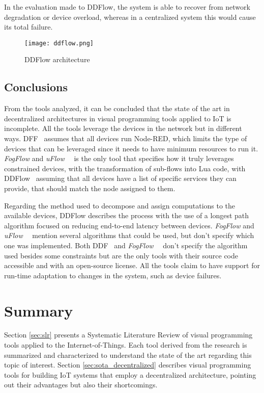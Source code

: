 In the evaluation made to DDFlow, the system is able to recover from network degradation or device overload, whereas in a centralized system this would cause its total failure.

\begin{figure}[h]
\caption{DDFlow architecture}
\label{fig:ddflow}
\centering
\texttt{[image: ddflow.png]}
\end{figure}

\subsection{Conclusions}\label{sec:decentralized_sota_conclusions}

From the tools analyzed, it can be concluded that the state of the art in decentralized architectures in visual programming tools applied to IoT is incomplete. All the tools leverage the devices in the network but in different ways. DFF~\cite{ddf} assumes that all devices run Node-RED, which limits the type of devices that can be leveraged since it needs to have minimum resources to run it. \textit{FogFlow} and \textit{uFlow}~\cite{fog_flow}~\cite{flow_based_programming_fog} is the only tool that specifies how it truly leverages constrained devices, with the transformation of sub-flows into Lua code, with DDFlow~\cite{ddflow} assuming that all devices have a list of specific services they can provide, that should match the node assigned to them.

Regarding the method used to decompose and assign computations to the available devices, DDFlow describes the process with the use of a longest path algorithm focused on reducing end-to-end latency between devices. \textit{FogFlow} and \textit{uFlow}~\cite{fog_flow}~\cite{flow_based_programming_fog} mention several algorithms that could be used, but don't specify which one was implemented. Both DDF~\cite{ddf} and \textit{FogFlow}~\cite{fog_flow_easy}~\cite{fog_flow_tool} don't specify the algorithm used besides some constraints but are the only tools with their source code accessible and with an open-source license. All the tools claim to have support for run-time adaptation to changes in the system, such as device failures.


\section{Summary}

Section \ref{sec:slr} presents a Systematic Literature Review of visual programming tools applied to the Internet-of-Things. Each tool derived from the research is summarized and characterized to understand the state of the art regarding this topic of interest. Section \ref{sec:sota_decentralized} describes visual programming tools for building IoT systems that employ a decentralized architecture, pointing out their advantages but also their shortcomings.

